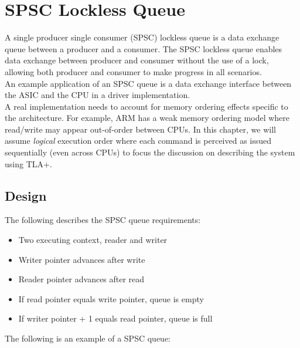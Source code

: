 % 

\chapter{SPSC Lockless Queue}

A single producer single consumer (SPSC) lockless queue is a data exchange queue
between a producer and a consumer. The SPSC lockless queue enables data exchange
between producer and consumer without the use of a lock, allowing both producer
and consumer to make progress in all scenarios.\\

An example application of an SPSC queue is a data exchange interface between the ASIC
and the CPU in a driver implementation.\\

A real implementation needs to account for memory ordering effects specific to
the architecture. For example, ARM has a weak memory ordering model where
read/write may appear out-of-order between CPUs. In this chapter, we will assume
\textit{logical} execution order where each command is perceived as issued
sequentially (even across CPUs) to focus the discussion on describing the system
using TLA+.\\

\section{Design}

The following describes the SPSC queue requirements: 

\begin{itemize}
    \item Two executing context, reader and writer
    \item Writer pointer advances after write 
    \item Reader pointer advances after read
    \item If read pointer equals write pointer, queue is empty
    \item If writer pointer + 1 equals read pointer, queue is full
\end{itemize}

The following is an example of a SPSC queue:
\begin{center}
\end{center}

